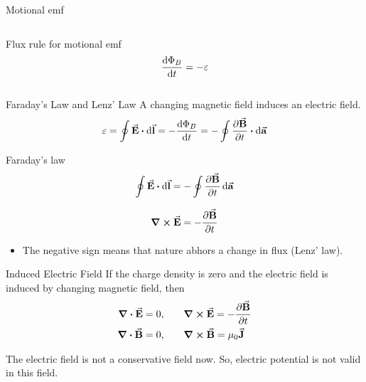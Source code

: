 \documentclass{beamer}
\begin{document}
\begin{frame}{Motional emf}
\begin{columns}
\begin{column}{0.5\textwidth}
            \begin{block}{Flux rule for motional emf}
                \begin{equation}
                    \dv{\Phi_B}{t} = -\varepsilon
                \end{equation}
            \end{block}
        \end{column}
    \end{columns}
\end{frame}


\begin{frame}{Faraday’s Law and Lenz' Law}
    A changing magnetic field induces an electric field.
    \begin{equation}
        \varepsilon = \oint \va{E} \vdot \dd{\va{l}} = -\dv{\Phi_B}{t} = -\oint\pdv{\va{B}}{t} \vdot \dd{\va{a}}
    \end{equation}

    \begin{block}{Faraday's law}
        \begin{equation}
            \oint \va{E} \vdot \dd{\va{l}} = -\oint \pdv{\va{B}}{t} \dd{\va{a}}
        \end{equation}

        \begin{equation}
            \curl{\va{E}} = -\pdv{\va{B}}{t}
        \end{equation}
    \end{block}

    \begin{itemize}
        \item The negative sign means that nature abhors a change in flux (Lenz' law).
    \end{itemize}
\end{frame}


\begin{frame}{Induced Electric Field}
    If the charge density is zero and the electric field is induced by changing magnetic field, then
    \begin{align}
        \div{\va{E}} = 0, \qquad & \curl{\va{E}} = -\pdv{\va{B}}{t} \\
        \div{\va{B}} = 0, \qquad & \curl{\va{B}} = \mu_0 \va{J}
    \end{align}

    The electric field is not a conservative field now. So, electric potential is not valid in this field.
\end{frame}
\end{document}
